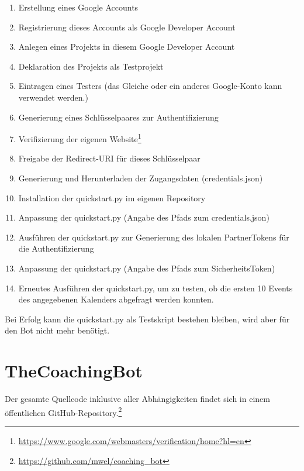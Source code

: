             \begin{enumerate}
                \item Erstellung eines Google Accounts
                \item Registrierung dieses Accounts als Google Developer Account
                \item Anlegen eines Projekts in diesem Google Developer Account
                \item Deklaration des Projekts als Testprojekt
                \item Eintragen eines Testers (das Gleiche oder ein anderes Google-Konto kann verwendet werden.)
                \item Generierung eines Schlüsselpaares zur Authentifizierung
                \item Verifizierung der eigenen Website\footnote{\url{https://www.google.com/webmasters/verification/home?hl=en}}
                \item Freigabe der Redirect-URI für dieses Schlüsselpaar
                \item Generierung und Herunterladen der Zugangsdaten (credentials.json)
                \item Installation der quickstart.py im eigenen Repository
                \item Anpassung der quickstart.py (Angabe des Pfads zum credentials.json)
                \item Ausführen der quickstart.py zur Generierung des lokalen Partner\-Tokens für die Authentifizierung
                \item Anpassung der quickstart.py (Angabe des Pfads zum Sicherheits\-Token)
                \item Erneutes Ausführen der quickstart.py, um zu testen, ob die ersten 10 Events des angegebenen Kalenders abgefragt werden konnten.                    
            \end{enumerate}
        
            Bei Erfolg kann die quickstart.py als Testskript bestehen bleiben, wird aber für den Bot nicht mehr benötigt.
        
    \section{TheCoachingBot}
        Der gesamte Quellcode inklusive aller Abhängigkeiten findet sich in einem öffentlichen GitHub-Repository.\footnote{\url{https://github.com/mwel/coaching_bot}}
        
